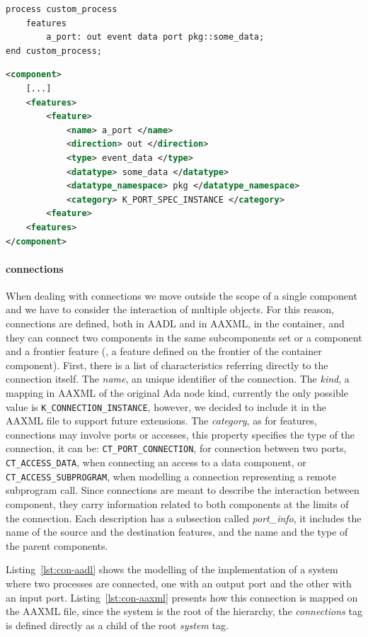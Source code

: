 \begin{lstlisting}[language=AADL,caption={Minimal AADL model containing features},label=lst:feature-aadl]
process custom_process
	features
		a_port: out event data port pkg::some_data;
end custom_process;
\end{lstlisting}

\begin{lstlisting}[language=XML,caption={AAXML description of AADL features},label=lst:feature-aaxml]
<component>
	[...]
	<features>
		<feature>
			<name> a_port </name>
			<direction> out </direction>
			<type> event_data </type>
			<datatype> some_data </datatype>
			<datatype_namespace> pkg </datatype_namespace>
			<category> K_PORT_SPEC_INSTANCE </category>
		<feature>
	<features>
</component>
\end{lstlisting}

\paragraph{connections} When dealing with connections we move outside the scope of a single component and we have to consider the interaction of multiple objects. For this reason, connections are defined, both in AADL and in AAXML, in the container, and they can connect two components in the same subcomponents set or a component and a frontier feature (\ie, a feature defined on the frontier of the container component). First, there is a list of characteristics referring directly to the connection itself. The \textit{name}, an unique identifier of the connection. The \textit{kind}, a mapping in AAXML of the original Ada node kind, currently the only possible value is \texttt{K\_CONNECTION\_INSTANCE}, however, we decided to include it in the AAXML file to support future extensions. The \textit{category}, as for features, connections may involve ports or accesses, this property specifies the type of the connection, it can be: \texttt{CT\_PORT\_CONNECTION}, for connection between two ports, \texttt{CT\_ACCESS\_DATA}, when connecting an access to a data component, or \texttt{CT\_ACCESS\_SUBPROGRAM}, when modelling a connection representing a remote subprogram call. Since connections are meant to describe the interaction between component, they carry information related to both components at the limits of the connection. Each description has a subsection called \textit{port\_info}, it includes the name of the source and the destination features, and the name and the type of the parent components.

Listing~\ref{lst:con-aadl} shows the modelling of the implementation of a system where two processes are connected, one with an output port and the other with an input port. Listing~\ref{lst:con-aaxml} presents how this connection is mapped on the AAXML file, since the system is the root of the hierarchy, the \textit{connections} tag is defined directly as a child of the root \textit{system} tag.

